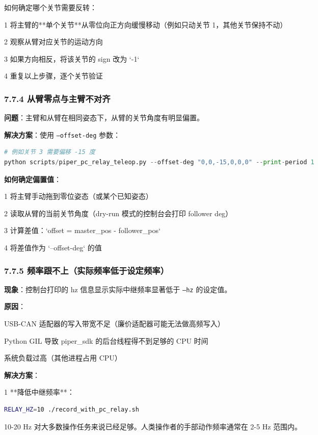 \documentclass[UTF8,a4paper,11pt]{ctexart}
\begin{document}
{如何确定哪个关节需要反转：
\item[1] 将主臂的**单个关节**从零位向正方向缓慢移动（例如只动关节 1，其他关节保持不动）
\item[2] 观察从臂对应关节的运动方向
\item[3] 如果方向相反，将该关节的 sign 改为 `-1`
\item[4] 重复以上步骤，逐个关节验证

\subsubsection{7.7.4 从臂零点与主臂不对齐}

\textbf{问题}：主臂和从臂在相同姿态下，从臂的关节角度有明显偏置。

\textbf{解决方案}：使用 \texttt{--offset-deg} 参数：

\begin{lstlisting}[language=python]
# 例如关节 3 需要偏移 -15 度
python scripts/piper_pc_relay_teleop.py --offset-deg "0,0,-15,0,0,0" --print-period 1
\end{lstlisting}

\textbf{如何确定偏置值}：

\item[1] 将主臂手动拖到零位姿态（或某个已知姿态）
\item[2] 读取从臂的当前关节角度（dry-run 模式的控制台会打印 follower deg）
\item[3] 计算差值：`offset = master_pos - follower_pos`
\item[4] 将差值作为 `--offset-deg` 的值

\subsubsection{7.7.5 频率跟不上（实际频率低于设定频率）}

\textbf{现象}：控制台打印的 hz 信息显示实际中继频率显著低于 \texttt{--hz} 的设定值。

\textbf{原因}：
\item USB-CAN 适配器的写入带宽不足（廉价适配器可能无法做高频写入）
\item Python GIL 导致 piper_sdk 的后台线程得不到足够的 CPU 时间
\item 系统负载过高（其他进程占用 CPU）

\textbf{解决方案}：

\item[1] **降低中继频率**：
\begin{lstlisting}[language=bash]
   RELAY_HZ=10 ./record_with_pc_relay.sh
\end{lstlisting}
   10-20 Hz 对大多数操作任务来说已经足够。人类操作者的手部动作频率通常在 2-5 Hz 范围内。

}
\end{document}
